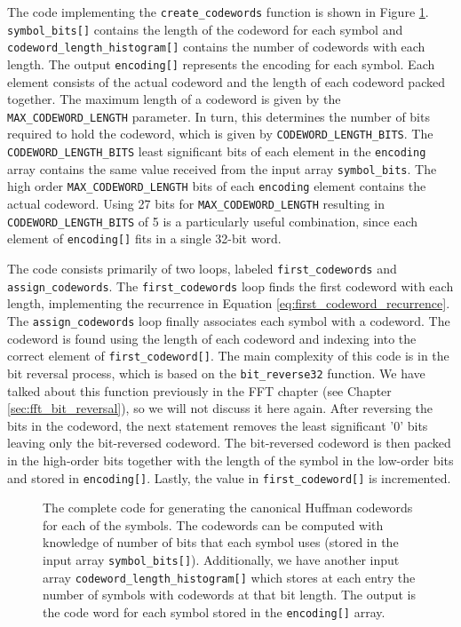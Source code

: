 The code implementing the \lstinline{create_codewords} function is shown in Figure \ref{fig:huffman_create_codeword.cpp}. \lstinline{symbol_bits[]} contains the length of the codeword for each symbol and \lstinline{codeword_length_histogram[]} contains the number of codewords with each length. The output \lstinline{encoding[]} represents the encoding for each symbol. Each element consists of the actual codeword and the length of each codeword packed together.  The maximum length of a codeword is given by the \lstinline{MAX_CODEWORD_LENGTH} parameter.  In turn, this determines the number of bits required to hold the codeword, which is given by  \lstinline{CODEWORD_LENGTH_BITS}. The \lstinline{CODEWORD_LENGTH_BITS} least significant bits of each element in the \lstinline{encoding} array contains the same value received from the input array \lstinline{symbol_bits}. The high order \lstinline{MAX_CODEWORD_LENGTH} bits of each \lstinline{encoding} element contains the actual codeword.  Using 27 bits for \lstinline{MAX_CODEWORD_LENGTH} resulting in \lstinline{CODEWORD_LENGTH_BITS} of 5 is a particularly useful combination, since each element of \lstinline{encoding[]} fits in a single 32-bit word.

The code consists primarily of two loops, labeled \lstinline{first_codewords} and \lstinline{assign_codewords}.  The \lstinline{first_codewords} loop finds the first codeword with each length, implementing the recurrence in Equation \ref{eq:first_codeword_recurrence}.   The \lstinline{assign_codewords} loop finally associates each symbol with a codeword.  The codeword is found using the length of each codeword and indexing into the correct element of \lstinline{first_codeword[]}.  The main complexity of this code is in the bit reversal process, which is based on the \lstinline{bit_reverse32} function. We have talked about this function previously in the FFT chapter (see Chapter \ref{sec:fft_bit_reversal}), so we will not discuss it here again. After reversing the bits in the codeword, the next statement removes the least significant '0' bits leaving only the bit-reversed codeword. The bit-reversed codeword is then packed in the high-order bits together with the length of the symbol in the low-order bits and stored in \lstinline{encoding[]}.  Lastly, the value in \lstinline{first_codeword[]} is incremented.

\begin{figure}
\begin{tiny}

\caption{ The complete code for generating the canonical Huffman codewords for each of the symbols. The codewords can be computed with knowledge of number of bits that each symbol uses (stored in the input array \lstinline{symbol_bits[]}). Additionally, we have another input array \lstinline{codeword_length_histogram[]} which stores at each entry the number of symbols with codewords at that bit length. The output is the code word for each symbol stored in the \lstinline{encoding[]} array. }
\end{tiny}
\label{fig:huffman_create_codeword.cpp}
\end{figure}

